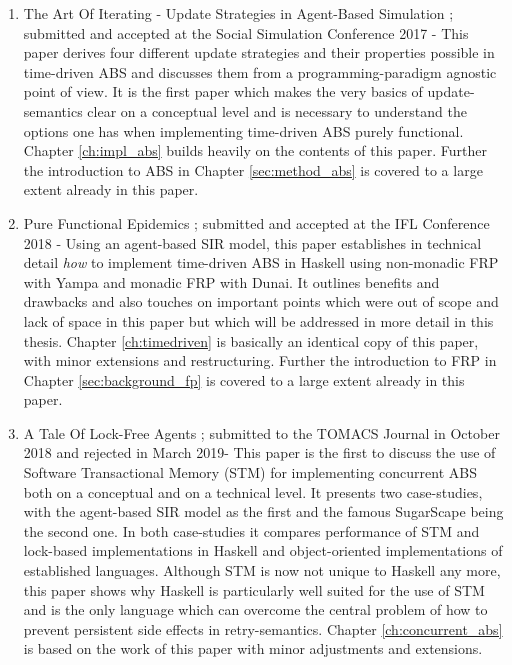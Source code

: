 \begin{enumerate}
	\item The Art Of Iterating - Update Strategies in Agent-Based Simulation \cite{thaler_art_2017}; submitted and accepted at the Social Simulation Conference 2017 - This paper derives four different update strategies and their properties possible in time-driven ABS and discusses them from a programming-paradigm agnostic point of view. It is the first paper which makes the very basics of update-semantics clear on a conceptual level and is necessary to understand the options one has when implementing time-driven ABS purely functional. Chapter \ref{ch:impl_abs} builds heavily on the contents of this paper. Further the introduction to ABS in Chapter \ref{sec:method_abs} is covered to a large extent already in this paper.
	
	\item Pure Functional Epidemics \cite{thaler_pure_2018}; submitted and accepted at the IFL Conference 2018 - Using an agent-based SIR model, this paper establishes in technical detail \textit{how} to implement time-driven ABS in Haskell using non-monadic FRP with Yampa and monadic FRP with Dunai. It outlines benefits and drawbacks and also touches on important points which were out of scope and lack of space in this paper but which will be addressed in more detail in this thesis. Chapter \ref{ch:timedriven} is basically an identical copy of this paper, with minor extensions and restructuring. Further the introduction to FRP in Chapter \ref{sec:background_fp} is covered to a large extent already in this paper.
	
	\item A Tale Of Lock-Free Agents \cite{thaler_tale_2018}; submitted to the TOMACS Journal in October 2018 and rejected in March 2019- This paper is the first to discuss the use of Software Transactional Memory (STM) for implementing concurrent ABS both on a conceptual and on a technical level. It presents two case-studies, with the agent-based SIR model as the first and the famous SugarScape being the second one. In both case-studies it compares performance of STM and lock-based implementations in Haskell and object-oriented implementations of established languages. Although STM is now not unique to Haskell any more, this paper shows why Haskell is particularly well suited for the use of STM and is the only language which can overcome the central problem of how to prevent persistent side effects in retry-semantics. Chapter \ref{ch:concurrent_abs} is based on the work of this paper with minor adjustments and extensions.


\end{enumerate}
